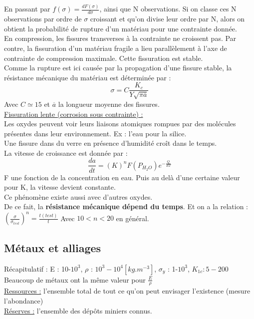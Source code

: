 \documentclass[../main.tex]{subfiles}
\begin{document}
En passant par $f(\sigma) = \frac{dF(\sigma)}{d\sigma}$, ainsi que N observations. Si on classe ces N observations par ordre de $\sigma$ croissant et qu'on divise leur ordre par N, alors on obtient la probabilité de rupture d'un matériau pour une contrainte donnée.\\

En compression, les fissures transverses à la contrainte ne croissent pas. Par contre, la fissuration d'un matériau fragile a lieu parallèlement à l'axe de contrainte de compression maximale. Cette fissuration est stable. \\
Comme la rupture est ici causée par la propagation d'une fissure stable, la résistance mécanique du matériau est déterminée par :\\
\begin{equation}
    \sigma = C \frac{K_c}{Y\sqrt{\pi \overline{a}}}
\end{equation}
Avec $C \simeq 15$ et $\overline{a}$ la longueur moyenne des fissures.\\

\quad \underline{Fissuration lente (corrosion sous contrainte) :}\\
Les oxydes peuvent voir leurs liaisons atomiques rompues par des molécules présentes dans leur environnement. Ex : l'eau pour la silice.\\
Une fissure dans du verre en présence d'humidité croît dans le temps. \\
La vitesse de croissance est donnée par :\\
\begin{equation}
    \frac{da}{dt} = (K)^n F(P_{H_2O}) e^{-\frac{Q}{RT}}
\end{equation}
F une fonction de la concentration en eau. Puis au delà d'une certaine valeur pour K, la vitesse devient constante. \\
Ce phénomène existe aussi avec d'autres oxydes.\\
De ce fait, la \textbf{résistance mécanique dépend du temps}. Et on a la relation : $(\frac{\sigma}{\sigma_{test}})^n = \frac{t(test)}{t}$
Avec $10<n<20$ en général. 


\subsection{Métaux et alliages}
Récapitulatif : E : 10-$10^3$, $\rho$ : $10^3-10^4[kg.m^{-3}]$, $\sigma_y$ : 1-$10^3$, $K_{1c} : 5-200$\\
Beaucoup de métaux ont la même valeur pour $\frac{E}{\rho}$\\
\quad \underline{Ressources :} l'ensemble total de tout ce qu'on peut envisager l'existence (mesure l'abondance)\\
\quad  \underline{Réserves :} l'ensemble des dépôts miniers connus.\\
\end{document}
